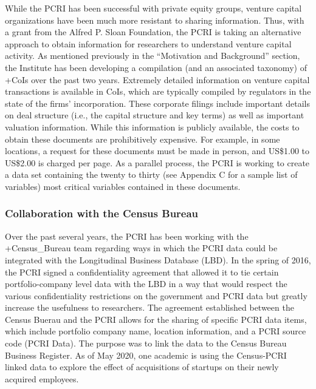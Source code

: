\documentclass[
]{WileySix}
\begin{document}
While the PCRI has been successful with private equity groups, venture capital organizations have been much more resistant to sharing information. Thus, with a grant from the Alfred P. Sloan Foundation, the PCRI is taking an alternative approach to obtain information for researchers to understand venture capital activity. As mentioned previously in the ``Motivation and Background'' section, the Institute has been developing a compilation (and an associated taxonomy) of +CoIs\textbar{} over the past two years. Extremely detailed information on venture capital transactions is available in CoIs, which are typically compiled by regulators in the state of the firms' incorporation. These corporate filings include important details on deal structure (i.e., the capital structure and key terms) as well as important valuation information. While this information is publicly available, the costs to obtain these documents are prohibitively expensive. For example, in some locations, a request for these documents must be made in person, and US\$1.00 to US\$2.00 is charged per page. As a parallel process, the PCRI is working to create a data set containing the twenty to thirty (see Appendix C for a sample list of variables) most critical variables contained in these documents.

\hypertarget{collaboration-with-the-census-bureau}{%
\subsubsection{Collaboration with the Census Bureau}\label{collaboration-with-the-census-bureau}}

Over the past several years, the PCRI has been working with the +Census\_Bureau\textbar{} team regarding ways in which the PCRI data could be integrated with the Longitudinal Business Database (LBD). In the spring of 2016, the PCRI signed a confidentiality agreement that allowed it to tie certain portfolio-company level data with the LBD in a way that would respect the various confidentiality restrictions on the government and PCRI data but greatly increase the usefulness to researchers. The agreement established between the Census Buerau and the PCRI allows for the sharing of specific PCRI data items, which include portfolio company name, location information, and a PCRI source code (PCRI Data). The purpose was to link the data to the Census Bureau Business Register. As of May 2020, one academic is using the Census-PCRI linked data to explore the effect of acquisitions of startups on their newly acquired employees.
\end{document}
